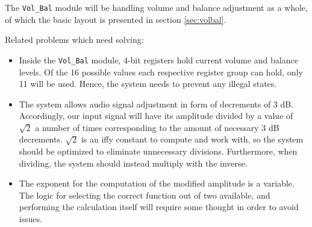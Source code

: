 The \verb=Vol_Bal= module will be handling volume and balance adjustment as a whole, of which the basic layout is presented in section \ref{sec:volbal}.

Related problems which need solving:

\begin{itemize}
\item Inside the \verb=Vol_Bal= module, 4-bit registers hold current volume and balance levels. Of the 16 possible values each respective register group can hold, only 11 will be used. Hence, the system needs to prevent any illegal states.
\item The system allows audio signal adjustment in form of decrements of 3 dB. Accordingly, our input signal will have its amplitude divided by a value of $\sqrt{2}$ a number of times corresponding to the amount of necessary 3 dB decrements. $\sqrt{2}$ is an iffy constant to compute and work with, so the system should be optimized to eliminate unnecessary divisions. Furthermore, when dividing, the system should instead multiply with the inverse.
\item The exponent for the computation of the modified amplitude is a variable. The logic for selecting the correct function out of two available, and performing the calculation itself will require some thought in order to avoid issues.
\end{itemize}
